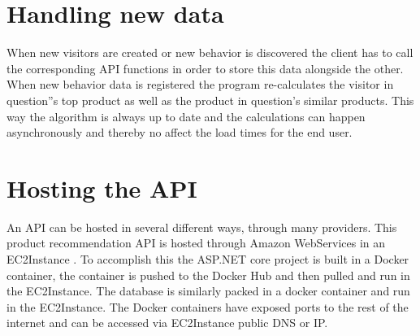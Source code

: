 \section{Handling new data}
When new visitors are created or new behavior is discovered the client has to call the corresponding API functions in order to store this data alongside the other. When new behavior data is registered the program re-calculates the visitor in question''s top product as well as the product in question's similar products. This way the algorithm is always up to date and the calculations can happen asynchronously and thereby no affect the load times for the end user.

\section{Hosting the API}
An API can be hosted in several different ways, through many providers. This product recommendation API is hosted through Amazon WebServices in an \gls{EC2Instance} \cite{EC2}. To accomplish this the ASP.NET core project is built in a Docker container, the container is pushed to the Docker Hub and then pulled and run in the \gls{EC2Instance}. The database is similarly packed in a docker container and run in the \gls{EC2Instance}. The Docker containers have exposed ports to the rest of the internet and can be accessed via \gls{EC2Instance} public DNS or IP.



			


 